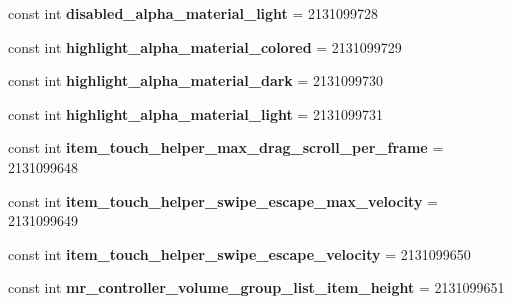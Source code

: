 \begin{DoxyCompactItemize}
const int {\bfseries disabled\+\_\+alpha\+\_\+material\+\_\+light} = 2131099728
\item 
\mbox{\label{class_sample_app_1_1_droid_1_1_resource_1_1_dimension_aa7970638177e97544e0511ccf36996a6}} 
const int {\bfseries highlight\+\_\+alpha\+\_\+material\+\_\+colored} = 2131099729
\item 
\mbox{\label{class_sample_app_1_1_droid_1_1_resource_1_1_dimension_ac8a6b04278fd5a60e7140fb01e58bd88}} 
const int {\bfseries highlight\+\_\+alpha\+\_\+material\+\_\+dark} = 2131099730
\item 
\mbox{\label{class_sample_app_1_1_droid_1_1_resource_1_1_dimension_af3bd655e0ce95388f780838bf653859e}} 
const int {\bfseries highlight\+\_\+alpha\+\_\+material\+\_\+light} = 2131099731
\item 
\mbox{\label{class_sample_app_1_1_droid_1_1_resource_1_1_dimension_a348239c5b83335d695a28515fa0c8ed5}} 
const int {\bfseries item\+\_\+touch\+\_\+helper\+\_\+max\+\_\+drag\+\_\+scroll\+\_\+per\+\_\+frame} = 2131099648
\item 
\mbox{\label{class_sample_app_1_1_droid_1_1_resource_1_1_dimension_a54afc1c1367d5613345f99fab243e703}} 
const int {\bfseries item\+\_\+touch\+\_\+helper\+\_\+swipe\+\_\+escape\+\_\+max\+\_\+velocity} = 2131099649
\item 
\mbox{\label{class_sample_app_1_1_droid_1_1_resource_1_1_dimension_a6c5936c717c7163b8ad0ec52e61af0ee}} 
const int {\bfseries item\+\_\+touch\+\_\+helper\+\_\+swipe\+\_\+escape\+\_\+velocity} = 2131099650
\item 
\mbox{\label{class_sample_app_1_1_droid_1_1_resource_1_1_dimension_a2c2e5a9214ce67b50ba9f0025e03d17f}} 
const int {\bfseries mr\+\_\+controller\+\_\+volume\+\_\+group\+\_\+list\+\_\+item\+\_\+height} = 2131099651
\item 
\mbox{\label{class_sample_app_1_1_droid_1_1_resource_1_1_dimension_ab2dceee463c7224263a2bb0d79199f03}} 

\end{DoxyCompactItemize}
